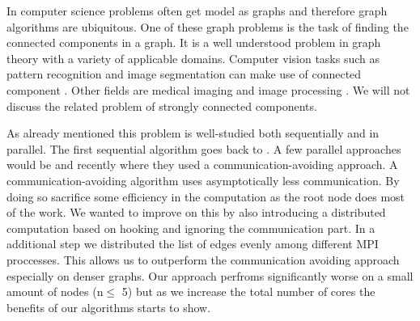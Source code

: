 

In computer science problems often get model as graphs and therefore graph algorithms are ubiquitous. One of these graph problems is the task of finding the connected components in a graph. It is a well understood problem in graph theory with a variety of applicable domains. Computer vision tasks such as pattern recognition and image segmentation \cite{683775} can make use of connected component \cite{Wilson:2006:RCV:1166253.1166292}. Other fields are medical imaging \cite{UDUPA1990355} and image processing \cite{Ambrosio2001}. We will not discuss the related problem of strongly connected components.

As already mentioned this problem is well-studied both sequentially and in parallel. The first sequential algorithm goes back to \cite{Hopcroft}. A few parallel approaches would be \cite{MANOHAR1989133}\cite{Han:1990:EFP:79147.214077} and recently \cite{comm_avoiding} where they used a communication-avoiding approach. A communication-avoiding algorithm uses asymptotically less communication. By doing so \cite{comm_avoiding} sacrifice some efficiency in the computation as the root node does most of the work. We wanted to improve on this by also introducing a distributed computation based on hooking \cite{article} and ignoring the communication part. In a additional step we distributed the list of edges evenly among different MPI proccesses. This allows us to outperform the communication avoiding approach especially on denser graphs. Our approach perfroms significantly worse on a small amount of nodes (n$\leq$ 5) but as we increase the total number of cores the benefits of our algorithms starts to show.

